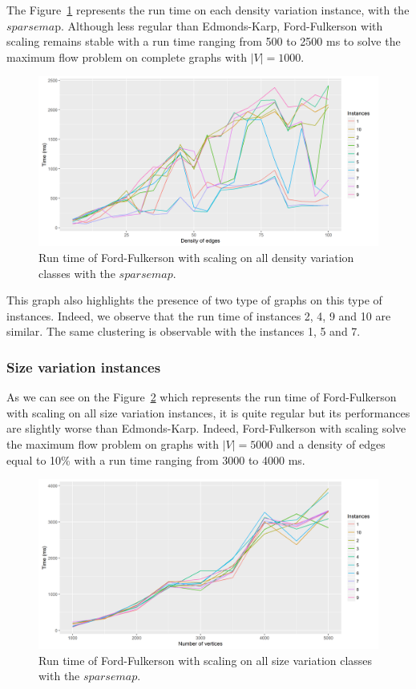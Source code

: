 The Figure~\ref{fig:FFmean} represents the run time on each density variation instance, with the $sparsema$p. Although less regular than Edmonds-Karp, Ford-Fulkerson with scaling remains stable with a run time ranging from 500 to 2500 ms to solve the maximum flow problem on complete graphs with $|V|=1000$.
\begin{figure}[H]
\begin{center}
\includegraphics[scale=0.5]{images/results/FFmean.png}
\caption{Run time of Ford-Fulkerson with scaling on all density variation classes with the $sparse map$.}
\label{fig:FFmean}
\end{center}
\end{figure}

This graph also highlights the presence of two type of graphs on this type of instances. Indeed, we observe that the run time of instances 2, 4, 9 and 10 are similar. The same clustering is observable with the instances 1, 5 and 7.

\subsubsection{Size variation instances}
As we can see on the Figure~\ref{fig:FFmeansize} which represents the run time of Ford-Fulkerson with scaling on all size variation instances, it is quite regular but its performances are slightly worse than Edmonds-Karp. Indeed, Ford-Fulkerson with scaling solve the maximum flow problem on graphs with $|V|=5000$ and a density of edges equal to 10\% with a run time ranging from 3000 to 4000 ms.
\begin{figure}[H]
\begin{center}
\includegraphics[scale=0.5]{images/results/FFmeansize2.png}
\caption{Run time of Ford-Fulkerson with scaling on all size variation classes with the $sparse map$.}
\label{fig:FFmeansize}
\end{center}
\end{figure}

